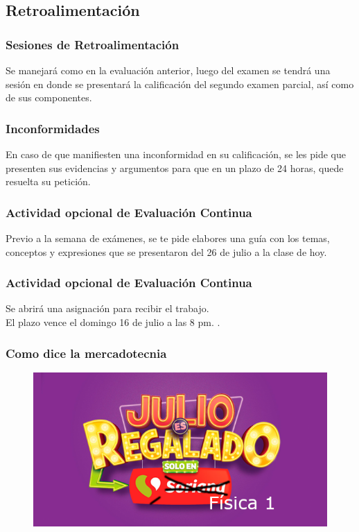 \documentclass[14pt]{beamer}
\begin{document}
\subsection{Retroalimentación}

\begin{frame}
\frametitle{Sesiones de Retroalimentación}
Se manejará como en la evaluación anterior, luego del examen se tendrá una sesión en donde se presentará la calificación del segundo examen parcial, así como de sus componentes.
\end{frame}
\begin{frame}
\frametitle{Inconformidades}
En caso de que manifiesten una inconformidad en su calificación, se les pide que presenten sus evidencias y argumentos para que en un plazo de 24 horas, quede resuelta su petición.
\end{frame}
\begin{frame}
\frametitle{Actividad opcional de Evaluación Continua}
Previo a la semana de exámenes, se te pide elabores  una guía con los temas, conceptos y expresiones que se presentaron del 26 de julio a la clase de hoy.
\end{frame}
\begin{frame}
\frametitle{Actividad opcional de Evaluación Continua}
Se abrirá una asignación para recibir el trabajo.
\\
\bigskip
\pause
El plazo vence el domingo 16 de julio a las 8 pm. .
\end{frame}
\begin{frame}
\frametitle{Como dice la mercadotecnia}
\begin{figure}
    \centering
    \includegraphics[scale=0.5]{Imagenes/Julio_Regalado.png}
\end{figure}
\end{frame}
\end{document}

